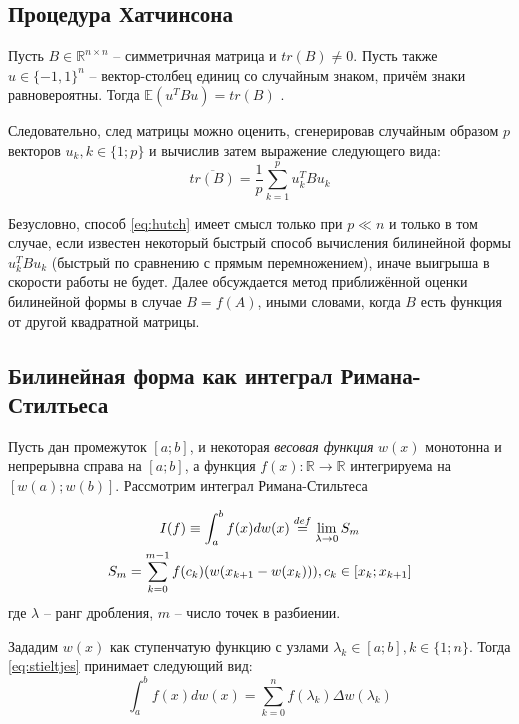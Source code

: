 \subsection{Процедура Хатчинсона}

Пусть $ B \in \mathds{R}^{n\times n} $ -- симметричная матрица и $ tr(B) \ne 0 $.
Пусть также $ u \in \{-1, 1\}^n $ -- вектор-столбец единиц со случайным знаком, причём знаки равновероятны. Тогда $ \mathds{E} (u^T B u) = tr(B) $ \cite{golub2010matMomentsQuadr}.

Следовательно, след матрицы можно оценить, сгенерировав случайным образом $ p $ векторов $ u_k, k \in \{1;p\} $ и вычислив затем выражение следующего вида:
\begin{equation}\label{eq:hutch}
    \overline{tr(B)} = \frac{1}{p} \sum_{k=1}^p u_k^T B u_k
\end{equation}

Безусловно, способ \eqref{eq:hutch} имеет смысл только при $ p \ll n $ и только в том случае, если известен некоторый быстрый способ вычисления билинейной формы $ u_k^T B u_k $ (быстрый по сравнению с прямым перемножением), иначе выигрыша в скорости работы не будет.
Далее обсуждается метод приближённой оценки билинейной формы в случае $ B = f(A) $, иными словами, когда $B$ есть функция от другой квадратной матрицы.

\subsection{Билинейная форма как интеграл Римана-Стилтьеса}\label{section:stieltjes}

Пусть дан промежуток $ [a;b] $, и некоторая \emph{весовая функция} $ w(x) $ монотонна и непрерывна справа на $ [a;b] $, а функция $f(x): \mathds{R}\to \mathds{R}$ интегрируема на $ [w(a);w(b)] $.
Рассмотрим интеграл Римана-Стильтеса

\begin{gather}
    \label{eq:stieltjes}
    I(f) \equiv \int_{a}^{b} f(x) dw(x) \overset{def}= \lim_{\lambda \to 0} S_m \\
    \label{eq:stieltjesSum}
    \space S_m = \sum_{k=0}^{m-1} f(c_k) (w(x_{k+1}-w(x_k))), c_k \in [x_k; x_{k+1}]
\end{gather}
где $\lambda$ -- ранг дробления, $m$ -- число точек в разбиении.

Зададим $ w(x) $ как ступенчатую функцию с узлами $ \lambda_k \in [a;b], k \in \{1;n\} $.
Тогда \eqref{eq:stieltjes} принимает следующий вид:
\begin{equation}\label{eq:stieltjesDiscrete}
    \int_{a}^{b} f(x) dw(x) = \sum_{k=0}^n f(\lambda_k) \Delta w(\lambda_k)
\end{equation}

